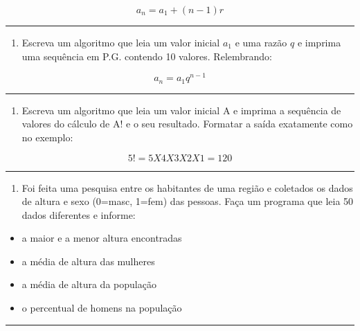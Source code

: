 \documentclass[12pt,a4paper]{article}
\providecommand{\tightlist}{%
      \setlength{\itemsep}{0pt}\setlength{\parskip}{0pt}}
\begin{document}
\[a_n = a_1 + (n-1)r\]

    \begin{center}\rule{0.5\linewidth}{0.5pt}\end{center}

\begin{enumerate}
\def\labelenumi{\arabic{enumi}.}
\setcounter{enumi}{4}
\tightlist
\item
  Escreva um algoritmo que leia um valor inicial \(a_1\) e uma razão
  \(q\) e imprima uma sequência em P.G. contendo 10 valores.
  Relembrando:
\end{enumerate}

\[a_n = a_1q^{n-1}\]

    \begin{center}\rule{0.5\linewidth}{0.5pt}\end{center}

\begin{enumerate}
\def\labelenumi{\arabic{enumi}.}
\setcounter{enumi}{5}
\tightlist
\item
  Escreva um algoritmo que leia um valor inicial A e imprima a sequência
  de valores do cálculo de A! e o seu resultado. Formatar a saída
  exatamente como no exemplo:
\end{enumerate}

\[5! = 5 X 4 X 3 X 2 X 1 = 120\]

    \begin{center}\rule{0.5\linewidth}{0.5pt}\end{center}

\begin{enumerate}
\def\labelenumi{\arabic{enumi}.}
\setcounter{enumi}{6}
\tightlist
\item
  Foi feita uma pesquisa entre os habitantes de uma região e coletados
  os dados de altura e sexo (0=masc, 1=fem) das pessoas. Faça um
  programa que leia 50 dados diferentes e informe:
\end{enumerate}

\begin{itemize}
\tightlist
\item
  a maior e a menor altura encontradas
\item
  a média de altura das mulheres
\item
  a média de altura da população
\item
  o percentual de homens na população
\end{itemize}

    \begin{center}\rule{0.5\linewidth}{0.5pt}\end{center}
\end{document}
